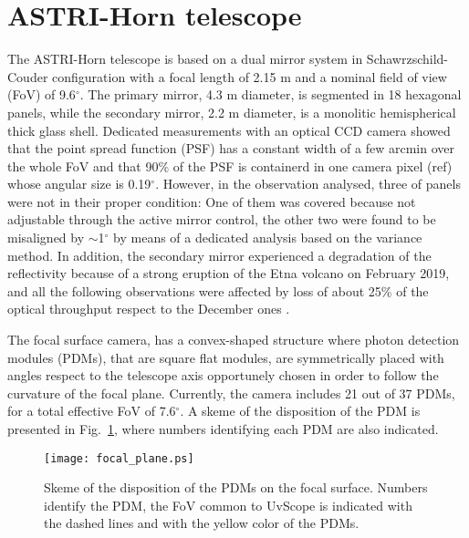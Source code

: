 \section{ASTRI-Horn telescope} 
The ASTRI-Horn telescope is based on a dual mirror system in Schawrzschild-Couder configuration
with a focal length of 2.15 m and a nominal field of view (FoV) of 9.6$^\circ$. 
The primary mirror, 4.3 m diameter, is segmented in 18 hexagonal panels, 
while the secondary mirror, 2.2 m diameter, is a monolitic hemispherical thick glass shell. 
Dedicated measurements  with an optical CCD camera showed that the
point spread function (PSF) has a constant width of a few arcmin
over the whole FoV and that  90\% of the PSF  is containerd in one camera pixel (ref)
whose angular size is 0.19$^\circ$. 
However, in the observation analysed, three of panels were not in their proper condition:
One of them was covered because not adjustable through the active mirror control, the other two were found to be misaligned by $\sim$1$^\circ$ by means of a dedicated analysis based on the variance method.
In addition, the secondary mirror experienced a degradation of the reflectivity because of a strong eruption of the Etna volcano on February 2019, and all the following observations were affected by loss of about 25\% of the optical throughput
respect to the December ones \cite{Mineo2019}. 

The focal surface camera, has a convex-shaped structure where
photon detection modules (PDMs), that are square flat modules, are symmetrically placed
with angles respect to the telescope axis opportunely chosen in order to follow the curvature of the focal plane.
Currently, the camera includes 21 out of 37 PDMs, for a total effective FoV of 7.6$^\circ$.
A skeme of the disposition of the PDM is presented in Fig.~\ref{fig:camera}, where numbers identifying each PDM are also indicated. 
\begin{figure}
\texttt{[image: focal\_plane.ps]}
\caption{Skeme of the disposition of the PDMs on the focal surface. Numbers identify the PDM, the FoV common to UvScope is indicated with the dashed lines and with the yellow color of the PDMs.}
\label{fig:camera}
\end{figure}

